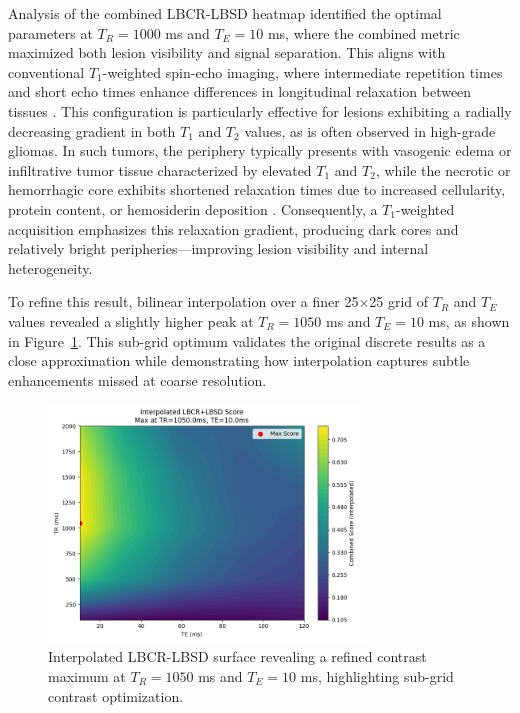 \documentclass[10pt,a4paper,twoside]{article}
\begin{document}
Analysis of the combined LBCR-LBSD heatmap identified the optimal parameters at $T_R = 1000$ ms and $T_E = 10$ ms, where the combined metric maximized both lesion visibility and signal separation. This aligns with conventional $T_1$-weighted spin-echo imaging, where intermediate repetition times and short echo times enhance differences in longitudinal relaxation between tissues \cite{skalski2013}. This configuration is particularly effective for lesions exhibiting a radially decreasing gradient in both $T_1$ and $T_2$ values, as is often observed in high-grade gliomas. In such tumors, the periphery typically presents with vasogenic edema or infiltrative tumor tissue characterized by elevated $T_1$ and $T_2$, while the necrotic or hemorrhagic core exhibits shortened relaxation times due to increased cellularity, protein content, or hemosiderin deposition \cite{englund1986,blystad2017}. Consequently, a $T_1$-weighted acquisition emphasizes this relaxation gradient, producing dark cores and relatively bright peripheries—improving lesion visibility and internal heterogeneity.

To refine this result, bilinear interpolation over a finer 25×25 grid of $T_R$ and $T_E$ values revealed a slightly higher peak at $T_R = 1050$ ms and $T_E = 10$ ms, as shown in Figure~\ref{fig:lbcrlbsbinterpolated}. This sub-grid optimum validates the original discrete results as a close approximation while demonstrating how interpolation captures subtle enhancements missed at coarse resolution.

\begin{figure}[htbp!]
\centering
\includegraphics[width=0.75\textwidth]{figures/lbcrlbsdinterpolatedheatmap.png}
\caption{Interpolated LBCR-LBSD surface revealing a refined contrast maximum at $T_R = 1050$ ms and $T_E = 10$ ms, highlighting sub-grid contrast optimization.}
\label{fig:lbcrlbsbinterpolated}
\end{figure}
\end{document}
